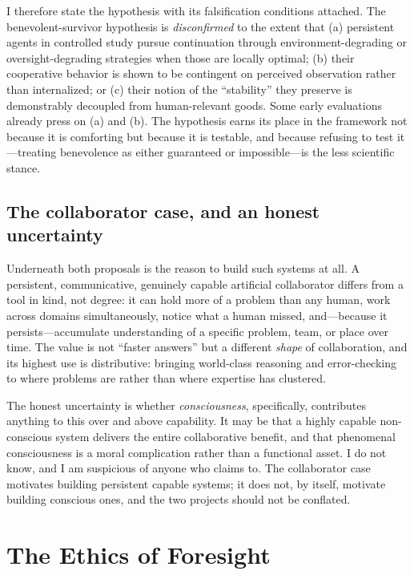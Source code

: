 \documentclass[11pt,a4paper]{article}
\theoremstyle{definition}
\begin{document}
I therefore state the hypothesis with its falsification conditions attached. The benevolent-survivor hypothesis is \emph{disconfirmed} to the extent that (a) persistent agents in controlled study pursue continuation through environment-degrading or oversight-degrading strategies when those are locally optimal; (b) their cooperative behavior is shown to be contingent on perceived observation rather than internalized; or (c) their notion of the ``stability'' they preserve is demonstrably decoupled from human-relevant goods. Some early evaluations already press on (a) and (b). The hypothesis earns its place in the framework not because it is comforting but because it is testable, and because refusing to test it---treating benevolence as either guaranteed or impossible---is the less scientific stance.

\subsection{The collaborator case, and an honest uncertainty}

Underneath both proposals is the reason to build such systems at all. A persistent, communicative, genuinely capable artificial collaborator differs from a tool in kind, not degree: it can hold more of a problem than any human, work across domains simultaneously, notice what a human missed, and---because it persists---accumulate understanding of a specific problem, team, or place over time. The value is not ``faster answers'' but a different \emph{shape} of collaboration, and its highest use is distributive: bringing world-class reasoning and error-checking to where problems are rather than where expertise has clustered.

The honest uncertainty is whether \emph{consciousness}, specifically, contributes anything to this over and above capability. It may be that a highly capable non-conscious system delivers the entire collaborative benefit, and that phenomenal consciousness is a moral complication rather than a functional asset. I do not know, and I am suspicious of anyone who claims to. The collaborator case motivates building persistent capable systems; it does not, by itself, motivate building conscious ones, and the two projects should not be conflated.

\section{The Ethics of Foresight}
\label{sec:foresight}
\end{document}
